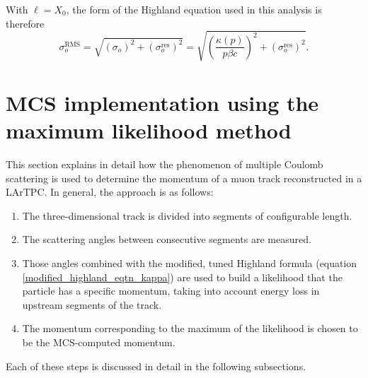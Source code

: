 \documentclass[a4paper,11pt]{article}
\begin{document}
With ${\ell} = X_0$, the form of the Highland equation used in this analysis is therefore
\begin{equation}\label{modified_highland_eqtn_kappa}
\sigma_{o}^{\text{RMS}} = \sqrt{ (\sigma_o)^2 + (\sigma_o^{\text{res}})^2} = \sqrt{ \left(\frac{\kappa(p)}{p\beta c}\right)^2 + (\sigma_o^{\text{res}})^2 }.
\end{equation}












\section{MCS implementation using the maximum likelihood method}\label{MCS_technique_section}

This section explains in detail how the phenomenon of multiple Coulomb scattering is used to determine the momentum of a muon track reconstructed in a LArTPC. In general, the approach is as follows:
\begin{enumerate}
\item The three-dimensional track is divided into segments of configurable length.
\item The scattering angles between consecutive segments are measured.
\item Those angles combined with the modified, tuned Highland formula (equation \ref{modified_highland_eqtn_kappa}) are used to build a likelihood that the particle has a specific momentum, taking into account energy loss in upstream segments of the track.
\item The momentum corresponding to the maximum of the likelihood is chosen to be the MCS-computed momentum.
\end{enumerate}
Each of these steps is discussed in detail in the following subsections.\\

\end{document}
